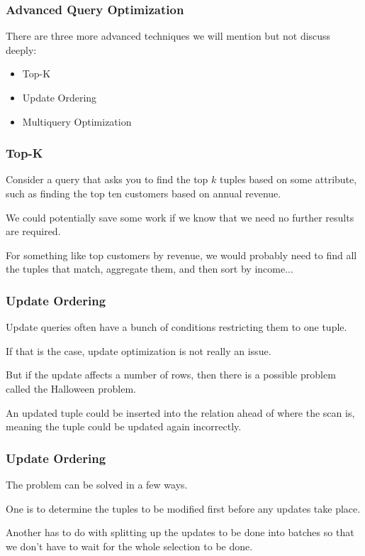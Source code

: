 \begin{frame}
\frametitle{Advanced Query Optimization}

There are three more advanced techniques we will mention but not discuss deeply:

\begin{itemize}
	\item Top-K
	\item Update Ordering
	\item Multiquery Optimization
\end{itemize}


\end{frame}

\begin{frame}
\frametitle{Top-K}

Consider a query that asks you to find the top $k$ tuples based on some attribute, such as finding the top ten customers based on annual revenue. 

We could potentially save some work if we know that we need no further results are required.

For something like top customers by revenue, we would probably need to find all the tuples that match, aggregate them, and then sort by income...

\end{frame}


\begin{frame}
\frametitle{Update Ordering}

Update queries often have a bunch of conditions restricting them to one tuple. 

If that is the case, update optimization is not really an issue. 

But if the update affects a number of rows, then there is a possible problem called the \alert{Halloween problem}.

An updated tuple could be inserted into the relation ahead of where the scan is, meaning the tuple could be updated again incorrectly. 

\end{frame}

\begin{frame}
\frametitle{Update Ordering}

The problem can be solved in a few ways. 

One is to determine the tuples to be modified first before any updates take place. 

Another has to do with splitting up the updates to be done into batches so that we don't have to wait for the whole selection to be done.


\end{frame}


